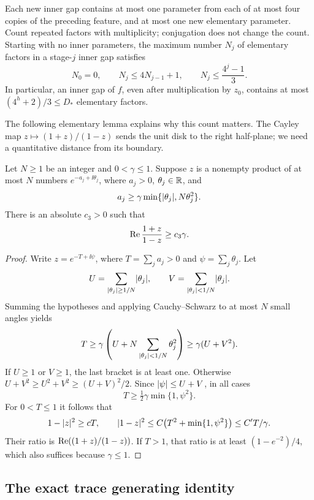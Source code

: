 Each new inner gap contains at most one parameter from each of at most
four copies of the preceding feature, and at most one new elementary
parameter.  Count repeated factors with multiplicity; conjugation does
not change the count.  Starting with no inner parameters, the maximum
number $N_j$ of elementary factors in a stage-$j$ inner gap satisfies
\[
 N_0=0,\qquad N_j\le4N_{j-1}+1,
 \qquad N_j\le\frac{4^j-1}{3}.
\]
In particular, an inner gap of $f$, even after multiplication by $z_0$,
contains at most $(4^h+2)/3\le D_*$ elementary factors.

The following elementary lemma explains why this count matters.  The
Cayley map $z\mapsto(1+z)/(1-z)$ sends the unit disk to the right
half-plane; we need a quantitative distance from its boundary.

\begin{lemma}
\label{lem:product-cayley}
Let $N\ge1$ be an integer and $0<\gamma\le1$.  Suppose $z$ is a
nonempty product of at most $N$ numbers $e^{-a_j+\ii\theta_j}$, where
$a_j>0$, $\theta_j\in\mathbb R$, and
\[
 a_j\ge\gamma\min\{\lvert \theta_j\rvert,N\theta_j^2\}.
\]
There is an absolute $c_3>0$ such that
\[
 \operatorname{Re}\frac{1+z}{1-z}\ge c_3\gamma.
\]
\end{lemma}

\begin{proof}
Write $z=e^{-T+\ii\psi}$, where $T=\sum_j a_j>0$ and
$\psi=\sum_j\theta_j$.  Let
\[
 U=\sum_{\lvert \theta_j\rvert\ge1/N}\lvert \theta_j\rvert,
 \qquad V=\sum_{\lvert \theta_j\rvert<1/N}\lvert \theta_j\rvert.
\]
Summing the hypotheses and applying Cauchy--Schwarz to at most $N$
small angles yields
\[
 T\ge\gamma\left(U+N\sum_{\lvert \theta_j\rvert<1/N}\theta_j^2\right)
   \ge\gamma(U+V^2).
\]
If $U\ge1$ or $V\ge1$, the last bracket is at least one.
Otherwise $U+V^2\ge U^2+V^2\ge(U+V)^2/2$.
Since $\lvert \psi\rvert\le U+V$, in all cases
\[
 T\ge\tfrac12\gamma\min\{1,\psi^2\}.
\]
For $0<T\le1$ it follows that
\[
 1-\lvert z\rvert^2\ge cT,\qquad
 \lvert 1-z\rvert^2\le C\bigl(T^2+\min\{1,\psi^2\}\bigr)
                 \le C'T/\gamma.
\]
Their ratio is $\operatorname{Re}((1+z)/(1-z))$.  If $T>1$, that ratio is at least
$(1-e^{-2})/4$, which also suffices because $\gamma\le1$.
\end{proof}

\subsection{The exact trace generating identity}

